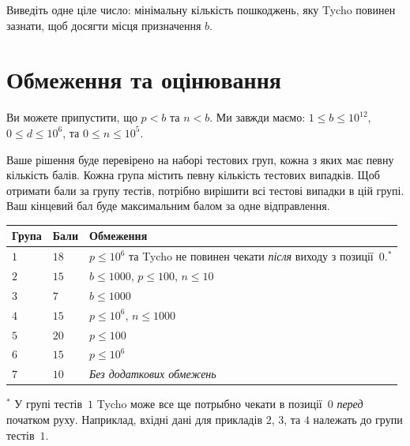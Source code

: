 Виведіть одне ціле число: мінімальну кількість пошкоджень, яку Tycho повинен зазнати, щоб досягти місця призначення $b$.

\section*{Обмеження та оцінювання}

Ви можете припустити, що
$p < b$ %
та
$n < b$. %
Ми завжди маємо:
$1\leq b\leq 10^{12}$, %
$0\leq d \leq 10^6$, %
та
$0\leq n \leq 10^5$. %

Ваше рішення буде перевірено на наборі тестових груп, кожна з яких має певну кількість балів.
Кожна група містить певну кількість тестових випадків.
Щоб отримати бали за групу тестів, потрібно вирішити всі тестові випадки в цій групі.
Ваш кінцевий бал буде максимальним балом за одне відправлення.

\medskip
\begin{tabular}{lll}
Група & Бали & Обмеження \\\hline
  $1$ & $18$  & $p\leq 10^6$ та Tycho не повинен чекати \emph{після} виходу з позиції~$0$.$^*$ \\ %
  $2$ & $15$  & $b\leq 1000$, $p\leq 100$, $n\leq 10$ \\
  $3$ & $7$  & $b\leq 1000$ \\
  $4$ & $15$ & $p\leq 10^6$, $n\leq 1000$\\
  $5$ & $20$ & $p\leq 100$\\
  $6$ & $15$ & $p\leq 10^6$\\
  $7$ & $10$ & \emph{Без додаткових обмежень}
\end{tabular}

\medskip
\noindent $^*$ У групі тестів~$1$ Tycho може все ще потрыбно чекати в позиції~$0$ \emph{перед} початком руху.
Наприклад, вхідні дані для прикладів $2$, $3$, та $4$ належать до групи тестів~$1$.
